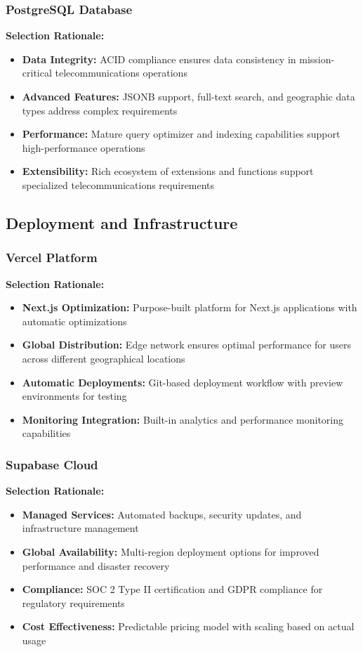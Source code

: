 \subsubsection{PostgreSQL Database}
\textbf{Selection Rationale:}
\begin{itemize}
\item \textbf{Data Integrity:} ACID compliance ensures data consistency in mission-critical telecommunications operations
\item \textbf{Advanced Features:} JSONB support, full-text search, and geographic data types address complex requirements
\item \textbf{Performance:} Mature query optimizer and indexing capabilities support high-performance operations
\item \textbf{Extensibility:} Rich ecosystem of extensions and functions support specialized telecommunications requirements
\end{itemize}

\subsection{Deployment and Infrastructure}

\subsubsection{Vercel Platform}
\textbf{Selection Rationale:}
\begin{itemize}
\item \textbf{Next.js Optimization:} Purpose-built platform for Next.js applications with automatic optimizations
\item \textbf{Global Distribution:} Edge network ensures optimal performance for users across different geographical locations
\item \textbf{Automatic Deployments:} Git-based deployment workflow with preview environments for testing
\item \textbf{Monitoring Integration:} Built-in analytics and performance monitoring capabilities
\end{itemize}

\subsubsection{Supabase Cloud}
\textbf{Selection Rationale:}
\begin{itemize}
\item \textbf{Managed Services:} Automated backups, security updates, and infrastructure management
\item \textbf{Global Availability:} Multi-region deployment options for improved performance and disaster recovery
\item \textbf{Compliance:} SOC 2 Type II certification and GDPR compliance for regulatory requirements
\item \textbf{Cost Effectiveness:} Predictable pricing model with scaling based on actual usage
\end{itemize}

